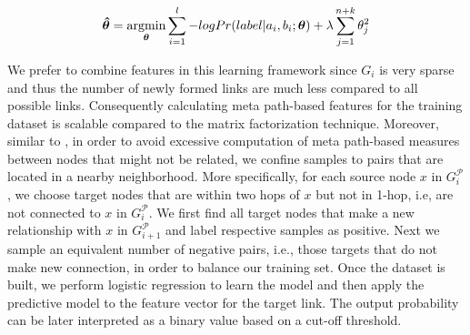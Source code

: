 
\begin{equation}
\boldsymbol{\hat{\theta}} = 
\operatorname*{argmin}\limits_{\boldsymbol{\theta}}\sum_{i=1}^l -log Pr(label |a_i, b_i; \boldsymbol{\theta}) + \lambda \sum_{j=1}^{n+k} \theta_j^2
\end{equation}
 
We prefer to combine features in this learning framework since $G_i$ is very sparse and thus the number of newly formed links are much less compared to all possible links. Consequently calculating meta path-based features for the training dataset is scalable compared to the matrix factorization technique. Moreover, similar to \cite{sun2011ASONAM}, in order to avoid excessive computation of meta path-based measures between nodes that might not be related, we confine samples to pairs that are located in a nearby neighborhood. More specifically, for each source node $x$ in $G^\mathcal{P}_{i}$, we choose target nodes that are within two hops of $x$ but not in 1-hop, i.e, are not connected to $x$ in $G^\mathcal{P}_{i}$. We first find all target nodes that make a new relationship with $x$  in $G^\mathcal{P}_{i+1}$ and label respective samples as positive. Next we sample an equivalent number of negative pairs, i.e., those targets that do not make new connection, in order to balance our training set. Once the dataset is built, we perform logistic regression to learn the model and then apply the predictive model to the feature vector for the target link. The output probability can be later interpreted as a binary value based on a cut-off threshold.











